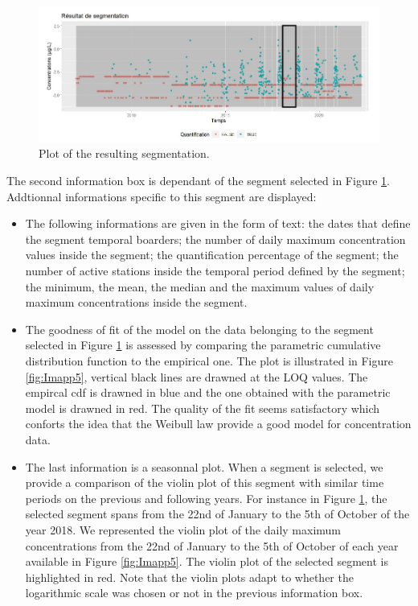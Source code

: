 \begin{itemize}
\begin{figure}[htbp]
  \centering
  \includegraphics[]{figs/Chap6/Im_appbis4.pdf}
  \caption{Plot of the resulting segmentation.}
  \label{fig:Imapp4}
\end{figure}     
\end{itemize}  



The second information box is dependant of the segment selected in Figure \ref{fig:Imapp4}. Addtionnal informations specific to this segment are displayed:
\begin{itemize}
\item The following informations are given in the form of text: the dates that define the segment temporal boarders; the number of daily maximum concentration values inside the segment; the quantification percentage of the segment; the number of active stations inside the temporal period defined by the segment; the minimum, the mean, the median and the maximum values of daily maximum concentrations inside the segment. 
\item The goodness of fit of the model on the data belonging to the segment selected in Figure \ref{fig:Imapp4} is assessed by comparing the parametric cumulative distribution function to the empirical one. The plot is illustrated in Figure \ref{fig:Imapp5}, vertical black lines are drawned at the LOQ values. The empircal cdf is drawned in blue and the one obtained with the parametric model is drawned in red. The quality of the fit seems satisfactory which conforts the idea that the Weibull law provide a good model for concentration data. 
\item The last information is a seasonnal plot. When a segment is selected, we provide a comparison of the violin plot of this segment with similar time periods on the previous and following years. For instance in Figure \ref{fig:Imapp4}, the selected segment spans from the 22nd of January to the 5th of October of the year 2018. We represented the violin plot of the daily maximum concentrations from the 22nd of January to the 5th of October of each year available in Figure \ref{fig:Imapp5}. The violin plot of the selected segment is highlighted in red. Note that the violin plots adapt to whether the logarithmic scale was chosen or not in the previous information box.
\end{itemize}  

